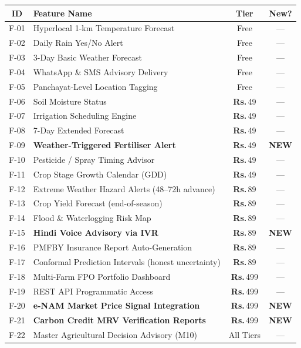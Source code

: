 \documentclass[12pt,a4paper]{article}
\newcommand{\Rup}{\textbf{Rs.\,}}
\begin{document}
\begin{center}
\small
\renewcommand{\arraystretch}{1.35}
\begin{tabular}{|c|p{6.5cm}|c|c|}
\hline
\rowcolor{primaryGreen}
\textbf{\color{white}ID} & \textbf{\color{white}Feature Name} & \textbf{\color{white}Tier} & \textbf{\color{white}New?} \\
\hline
F-01 & Hyperlocal 1-km Temperature Forecast & Free & --- \\
F-02 & Daily Rain Yes/No Alert & Free & --- \\
F-03 & 3-Day Basic Weather Forecast & Free & --- \\
F-04 & WhatsApp \& SMS Advisory Delivery & Free & --- \\
F-05 & Panchayat-Level Location Tagging & Free & --- \\
\hline
F-06 & Soil Moisture Status & \Rup49 & --- \\
F-07 & Irrigation Scheduling Engine & \Rup49 & --- \\
F-08 & 7-Day Extended Forecast & \Rup49 & --- \\
\rowcolor{rose!20}
F-09 & \textbf{Weather-Triggered Fertiliser Alert} & \Rup49 & \textbf{NEW} \\
F-10 & Pesticide / Spray Timing Advisor & \Rup49 & --- \\
F-11 & Crop Stage Growth Calendar (GDD) & \Rup49 & --- \\
\hline
F-12 & Extreme Weather Hazard Alerts (48--72h advance) & \Rup89 & --- \\
F-13 & Crop Yield Forecast (end-of-season) & \Rup89 & --- \\
F-14 & Flood \& Waterlogging Risk Map & \Rup89 & --- \\
\rowcolor{rose!20}
F-15 & \textbf{Hindi Voice Advisory via IVR} & \Rup89 & \textbf{NEW} \\
F-16 & PMFBY Insurance Report Auto-Generation & \Rup89 & --- \\
F-17 & Conformal Prediction Intervals (honest uncertainty) & \Rup89 & --- \\
\hline
F-18 & Multi-Farm FPO Portfolio Dashboard & \Rup499 & --- \\
F-19 & REST API Programmatic Access & \Rup499 & --- \\
\rowcolor{rose!20}
F-20 & \textbf{e-NAM Market Price Signal Integration} & \Rup499 & \textbf{NEW} \\
\rowcolor{rose!20}
F-21 & \textbf{Carbon Credit MRV Verification Reports} & \Rup499 & \textbf{NEW} \\
\hline
\rowcolor{cardBg}
F-22 & Master Agricultural Decision Advisory (M10) & All Tiers & --- \\
\hline
\end{tabular}
\end{center}
\end{document}
